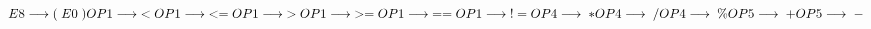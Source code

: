 \begin{math}
    E8 \longrightarrow (\;E0\;)\\
    OP1 \longrightarrow \;<\\
    OP1 \longrightarrow \;<=\\
    OP1 \longrightarrow \;>\\
    OP1 \longrightarrow \;>=\\
    OP1 \longrightarrow \;==\\
    OP1 \longrightarrow \;!=\\
    OP4 \longrightarrow \;*\\
    OP4 \longrightarrow \;/\\  
    OP4 \longrightarrow \;\%\\  
    OP5 \longrightarrow \;+\\  
    OP5 \longrightarrow \;-\\  

\end{math}
